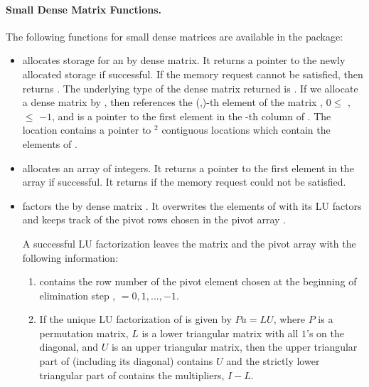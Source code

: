 \paragraph{Small Dense Matrix Functions.}
The following functions for small dense matrices are available in the
{\dense} package:
%
\begin{itemize}

\item {}
  \par {} allocates storage for an   by  dense matrix. 
  It returns a pointer to the newly allocated storage if            
  successful. If the memory request cannot be satisfied, then    
   returns . The underlying type of the dense matrix 
  returned is . If we allocate a dense matrix  by 
  , then  references the (,)-th element   
  of the matrix , $0 \le$ ,  $\le$ $-1$, and  
  is a pointer to the first element in the -th column of . 
  The location  contains a pointer to $^2$ contiguous locations which contain   
  the elements of .

\item {}
  \par {} allocates an array of  integers. 
  It returns a pointer to the first element in the array if successful. 
  It returns  if the memory request could not be satisfied.

\item {}
  \par {} factors the  by  dense matrix . 
  It overwrites the elements of  with its LU factors and keeps track of the
  pivot rows chosen in the pivot array .

  A successful LU factorization leaves the matrix  and the      
  pivot array  with the following information:                  
  \begin{enumerate}
  \item 
     contains the row number of the pivot element chosen   
    at the beginning of elimination step ,  $ = 0, 1, ..., $$-1$.  
                                                                 
  \item 
    If the unique LU factorization of  is given by $Pa = LU$,   
    where $P$ is a permutation matrix, $L$ is a lower triangular   
    matrix with all $1$'s on the diagonal, and $U$ is an upper     
    triangular matrix, then the upper triangular part of      
    (including its diagonal) contains $U$ and the strictly lower 
    triangular part of  contains the multipliers, $I-L$. 
                                                                  

\end{enumerate}
\end{itemize}
